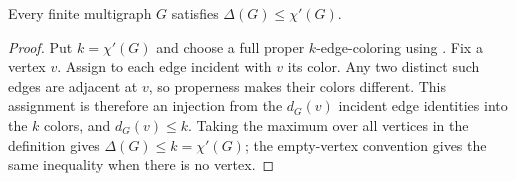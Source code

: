 \begin{lemma}
Every finite multigraph $G$ satisfies
$\Delta(G)\le\chi'(G)$.
\end{lemma}
\begin{proof}
Put $k=\chi'(G)$ and choose a full proper $k$-edge-coloring using
.  Fix a vertex $v$.  Assign to each edge
incident with $v$ its color.  Any two distinct such edges are adjacent at
$v$, so properness makes their colors different.  This assignment is
therefore an injection from the $d_G(v)$ incident edge identities into the
$k$ colors, and $d_G(v)\le k$.  Taking the maximum over all vertices in the
definition  gives
$\Delta(G)\le k=\chi'(G)$; the empty-vertex convention gives the same
inequality when there is no vertex.
\end{proof}
